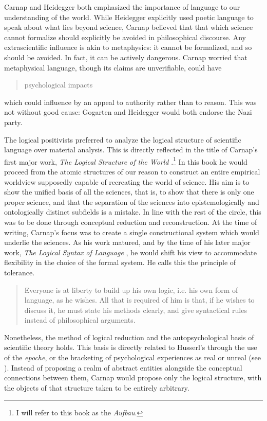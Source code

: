 \documentclass[leqno, 12pt]{turabian-researchpaper}
\begin{document}
	Carnap and Heidegger both emphasized the importance of language to our
	understanding of the world. While Heidegger explicitly used poetic language to
	speak about what lies beyond science, Carnap believed that that which science
	cannot formalize should explicitly be avoided in philosophical discourse. Any extrascientific
	influence is akin to metaphysics: it cannot be formalized, and so should be avoided.
	In fact, it can be actively dangerous. Carnap worried that metaphysical
	language, though its claims are unverifiable, could have \blockquote[]{psychological impacts}
	which could influence by an appeal to authority rather than to reason. This
	was not without good cause: Gogarten and Heidegger would both endorse the Nazi
	party. \autocite{dambock2022}

	The logical positivists preferred to analyze the logical structure of
	scientific language over material analysis. This is directly reflected in the title
	of Carnap's first major work, \textit{The Logical Structure of the World} \nocite{carnap2003}.\footnote{I
	will refer to this book as the \textit{Aufbau}.} In this book he would proceed
	from the atomic structures of our reason to construct an entire empirical
	worldview supposedly capable of recreating the world of science. His aim is to
	show the unified basis of all the sciences, that is, to show that there is only
	one proper science, and that the separation of the sciences into
	epistemologically and ontologically distinct subfields is a mistake. In line with
	the rest of the circle, this was to be done through conceptual reduction and
	reconstruction. At the time of writing, Carnap's focus was to create a single
	constructional system which would underlie the sciences. As his work matured,
	and by the time of his later major work, \textit{The Logical Syntax of
	Language} \nocite{carnap2000}, he would shift his view to accommodate
	flexibility in the choice of the formal system. He calls this the principle of
	tolerance. \blockquote[{}]{Everyone is at liberty to build up his own logic, i.e. his own form of language, as he wishes. All that is required of him is that, if he wishes to discuss it, he must state his methods clearly, and give syntactical rules instead of philosophical arguments.}
	Nonetheless, the method of logical reduction and the autopsychological basis of
	scientific theory holds. This basis is directly related to Husserl's through
	the use of the \textit{epoche}, or the bracketing of psychological experiences
	as real or unreal (see ). Instead of proposing a
	realm of abstract entities alongside the conceptual connections between them,
	Carnap would propose only the logical structure, with the objects of that structure
	taken to be entirely arbitrary.
\end{document}

